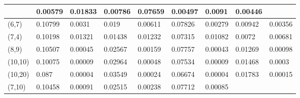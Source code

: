 \documentclass[10pt,twosided]{article}
\numberwithin{equation}{section}
\numberwithin{equation}{section}
\begin{document}
\begin{table}
\begin{tabular}{|p{41pt}|p{32pt}|p{38pt}|p{32pt}|p{38pt}|p{32pt}|p{38pt}|p{32pt}|p{38pt}|}
{} & \parbox{38pt}{\raggedright
0.00579
} & \parbox{32pt}{\raggedright
0.01833
} & \parbox{38pt}{\raggedright
0.00786
} & \parbox{32pt}{\raggedright
0.07659
} & \parbox{38pt}{\raggedright
0.00497
} & \parbox{32pt}{\raggedright
0.0091
} & \parbox{38pt}{\raggedright
0.00446
} \\
\hline
\parbox{41pt}{\raggedright
(6,7)
} & \parbox{32pt}{\raggedright
0.10799
} & \parbox{38pt}{\raggedright
0.0031
} & \parbox{32pt}{\raggedright
0.019
} & \parbox{38pt}{\raggedright
0.00611
} & \parbox{32pt}{\raggedright
0.07826
} & \parbox{38pt}{\raggedright
0.00279
} & \parbox{32pt}{\raggedright
0.00942
} & \parbox{38pt}{\raggedright
0.00356
} \\
\hline
\parbox{41pt}{\raggedright
(7,4)
} & \parbox{32pt}{\raggedright
0.10198
} & \parbox{38pt}{\raggedright
0.01321
} & \parbox{32pt}{\raggedright
0.01438
} & \parbox{38pt}{\raggedright
0.01232
} & \parbox{32pt}{\raggedright
0.07315
} & \parbox{38pt}{\raggedright
0.01082
} & \parbox{32pt}{\raggedright
0.0072
} & \parbox{38pt}{\raggedright
0.00681
} \\
\hline
\parbox{41pt}{\raggedright
(8,9)
} & \parbox{32pt}{\raggedright
0.10507
} & \parbox{38pt}{\raggedright
0.00045
} & \parbox{32pt}{\raggedright
0.02567
} & \parbox{38pt}{\raggedright
0.00159
} & \parbox{32pt}{\raggedright
0.07757
} & \parbox{38pt}{\raggedright
0.00043
} & \parbox{32pt}{\raggedright
0.01269
} & \parbox{38pt}{\raggedright
0.00098
} \\
\hline
\parbox{41pt}{\raggedright
(10,10)
} & \parbox{32pt}{\raggedright
0.10075
} & \parbox{38pt}{\raggedright
0.00009
} & \parbox{32pt}{\raggedright
0.02964
} & \parbox{38pt}{\raggedright
0.00048
} & \parbox{32pt}{\raggedright
0.07534
} & \parbox{38pt}{\raggedright
0.00009
} & \parbox{32pt}{\raggedright
0.01468
} & \parbox{38pt}{\raggedright
0.0003
} \\
\hline
\parbox{41pt}{\raggedright
(10,20)
} & \parbox{32pt}{\raggedright
0.087
} & \parbox{38pt}{\raggedright
0.00004
} & \parbox{32pt}{\raggedright
0.03549
} & \parbox{38pt}{\raggedright
0.00024
} & \parbox{32pt}{\raggedright
0.06674
} & \parbox{38pt}{\raggedright
0.00004
} & \parbox{32pt}{\raggedright
0.01783
} & \parbox{38pt}{\raggedright
0.00015
} \\
\hline
\parbox{41pt}{\raggedright
(7,10)
} & \parbox{32pt}{\raggedright
0.10458
} & \parbox{38pt}{\raggedright
0.00091
} & \parbox{32pt}{\raggedright
0.02515
} & \parbox{38pt}{\raggedright
0.00238
} & \parbox{32pt}{\raggedright
0.07712
} & \parbox{38pt}{\raggedright
0.00085
} & \parbox{32pt}{\raggedright
}
\end{tabular}
\end{table}
\end{document}
